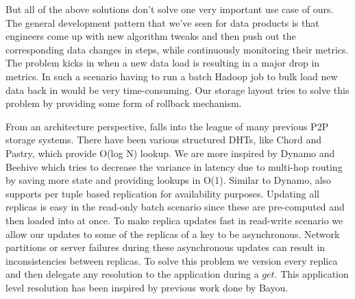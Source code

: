 But all of the above solutions don't solve one very important use case of ours. The general development pattern that we've seen for data products is that engineers come up with new algorithm tweaks and then push out the corresponding data changes in steps, while continuously monitoring their metrics. The problem kicks in when a new data load is resulting in a major drop in metrics. In such a scenario having to run a batch Hadoop job to bulk load new data back in would be very time-consuming. Our storage layout tries to solve this problem by providing some form of rollback mechanism. 
 
From an architecture perspective, \projectname{} falls into the league of many previous P2P storage systems. There have been various structured DHTs, like Chord\cite{chord} and Pastry\cite{pastry}, which provide O(log N) lookup. We are more inspired by Dynamo and Beehive\cite{beehive} which tries to decrease the variance in latency due to multi-hop routing by saving more state and providing lookups in O(1). Similar to Dynamo, \projectname{} also supports per tuple based replication for availability purposes. Updating all replicas is easy in the read-only batch scenario since these are pre-computed and then loaded into \projectname{} at once. To make replica updates fast in read-write scenario we allow our updates to some of the replicas of a key to be asynchronous. Network partitions or server failures during these asynchronous updates can result in inconsistencies between replicas. To solve this problem we version every replica and then delegate any resolution to the application during a $get$. This application level resolution has been inspired by previous work done by Bayou\cite{bayou}. 



